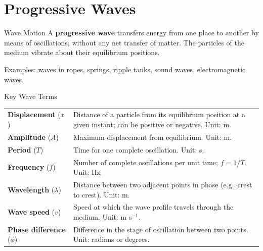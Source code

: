 

\section{Progressive Waves}

\begin{definitionbox}{Wave Motion}
A \textbf{progressive wave} transfers energy from one place to another by means of oscillations, without any net transfer of matter. The particles of the medium vibrate about their equilibrium positions.

Examples: waves in ropes, springs, ripple tanks, sound waves, electromagnetic waves.
\end{definitionbox}

\begin{definitionbox}{Key Wave Terms}
\renewcommand{\arraystretch}{1.5}
\begin{tabular}{@{} l p{9.5cm} @{}}
\textbf{Displacement} ($x$) & Distance of a particle from its equilibrium position at a given instant; can be positive or negative. Unit: m. \\
\textbf{Amplitude} ($A$) & Maximum displacement from equilibrium. Unit: m. \\
\textbf{Period} ($T$) & Time for one complete oscillation. Unit: s. \\
\textbf{Frequency} ($f$) & Number of complete oscillations per unit time; $f = 1/T$. Unit: Hz. \\
\textbf{Wavelength} ($\lambda$) & Distance between two adjacent points in phase (e.g.\ crest to crest). Unit: m. \\
\textbf{Wave speed} ($v$) & Speed at which the wave profile travels through the medium. Unit: m s$^{-1}$. \\
\textbf{Phase difference} ($\phi$) & Difference in the stage of oscillation between two points. Unit: radians or degrees. \\
\end{tabular}
\end{definitionbox}

